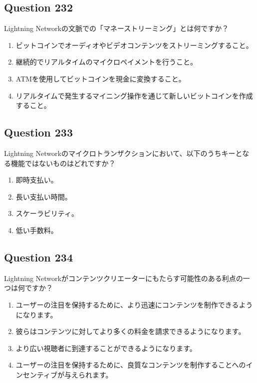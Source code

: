 \documentclass[12pt,a4paper]{article}
\begin{document}
\bigskip


\subsection*{Question 232}
Lightning Networkの文脈での「マネーストリーミング」とは何ですか？

\begin{enumerate}[label=\Alph*., leftmargin=*]
\item ビットコインでオーディオやビデオコンテンツをストリーミングすること。
\item 継続的でリアルタイムのマイクロペイメントを行うこと。
\item ATMを使用してビットコインを現金に変換すること。
\item リアルタイムで発生するマイニング操作を通じて新しいビットコインを作成すること。
\end{enumerate}

\bigskip


\subsection*{Question 233}
Lightning Networkのマイクロトランザクションにおいて、以下のうちキーとなる機能ではないものはどれですか？

\begin{enumerate}[label=\Alph*., leftmargin=*]
\item 即時支払い。
\item 長い支払い時間。
\item スケーラビリティ。
\item 低い手数料。
\end{enumerate}

\bigskip


\subsection*{Question 234}
Lightning Networkがコンテンツクリエーターにもたらす可能性のある利点の一つは何ですか？

\begin{enumerate}[label=\Alph*., leftmargin=*]
\item ユーザーの注目を保持するために、より迅速にコンテンツを制作できるようになります。
\item 彼らはコンテンツに対してより多くの料金を請求できるようになります。
\item より広い視聴者に到達することができるようになります。
\item ユーザーの注目を保持するために、良質なコンテンツを制作することへのインセンティブが与えられます。
\end{enumerate}
\end{document}
